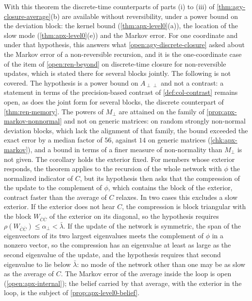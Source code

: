 With this theorem the discrete-time counterparts of parts (i) to (iii) of \cref{thm:agy-closure-average}(b) are available without reversibility, under a power bound on the deviation block: the kernel bound (\cref{thm:apx-level0}(a)), the location of the slow mode (\cref{thm:apx-level0}(e)) and the Markov error. For one coordinate and under that hypothesis, this answers what \cref{open:agy-discrete-closure} asked about the Markov error of a non-reversible recursion, and it is the one-coordinate case of the item of \cref{open:ren-beyond} on discrete-time closure for non-reversible updates, which is stated there for several blocks jointly. The following is not covered. The hypothesis is a power bound on $A_{\perp\perp}$ and not a contrast: a statement in terms of the precision-based contrast of \cref{def:col-contrast} remains open, as does the joint form for several blocks, the discrete counterpart of \cref{thm:ren-memory}. The powers of $M_\perp$ are attained on the family of \cref{prop:apx-markov-nonnormal} and not on generic matrices: on random strongly non-normal deviation blocks, which lack the alignment of that family, the bound exceeded the exact error by a median factor of $56$, against $14$ on generic matrices (\cref{chk:apx-markov}), and a bound in terms of a finer measure of non-normality than $M_\perp$ is not given. The corollary holds the exterior fixed. For members whose exterior responds, the theorem applies to the recursion of the whole network with $\phi$ the normalized indicator of $C$, but its hypothesis then asks that the compression of the update to the complement of $\phi$, which contains the block of the exterior, contract faster than the average of $C$ relaxes. In two cases this excludes a slow exterior. If the exterior does not hear $C$, the compression is block triangular with the block $W_{\bar C\bar C}$ of the exterior on its diagonal, so the hypothesis requires $\rho(W_{\bar C\bar C})\le\alpha_\perp<\bar\lambda$. If the update of the network is symmetric, the span of the eigenvectors of its two largest eigenvalues meets the complement of $\phi$ in a nonzero vector, so the compression has an eigenvalue at least as large as the second eigenvalue of the update, and the hypothesis requires that second eigenvalue to lie below $\bar\lambda$: no mode of the network other than one may be as slow as the average of $C$. The Markov error of the average inside the loop is open (\cref{open:apx-internal}); the belief carried by that average, with the exterior in the loop, is the subject of \cref{prop:apx-level0-belief}.

